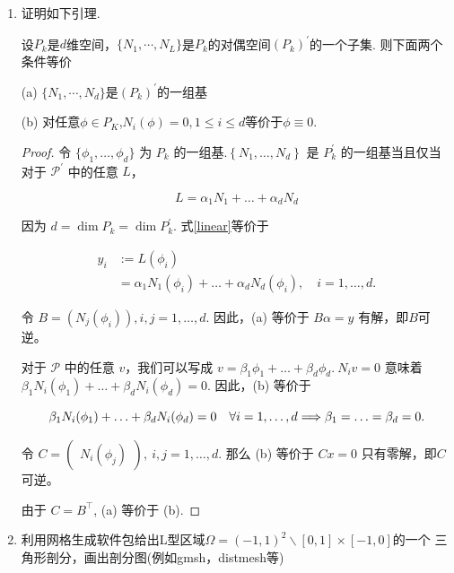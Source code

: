 \documentclass[12pt,a4paper]{article}
\begin{document}
	\begin{enumerate}
		\item 证明如下引理.
		
		设$P_k$是$d$维空间，$\{N_1,\cdots,N_L\}$是$P_k$的对偶空间$(P_k)^{\prime}$的一个子集. 则下面两个条件等价
		
		(a) $\{N_1,\cdots,N_d\}$是$(P_k)^{\prime}$的一组基
		
		(b) 对任意$\phi\in P_K$,$N_i(\phi)=0,1\leq i\leq d$等价于$\phi\equiv0.$
		
		\begin{proof}
			令 $\{\phi_1, \ldots , \phi_d\} $ 为 $P_k$ 的一组基.$\left\{N_1,\ldots,N_d\right\}$ 是 $P_k^{\prime}$ 的一组基当且仅当对于 $\mathcal{P} ^{\prime}$ 中的任意 $L$，
			
			\begin{equation}
				L=\alpha_1N_1+\ldots+\alpha_dN_d  \label{linear}
			\end{equation}
			
			因为 $d= \dim P_k = \dim P_k ^{\prime}$. 式\eqref{linear}等价于
			
			\begin{equation}
				\begin{aligned}
					y_i &:= L(\phi_i) \\
					&= \alpha_1N_1(\phi_i)+\ldots+\alpha_dN_d(\phi_i),\quad i=1,\ldots,d.
				\end{aligned}
			\end{equation}
			
			
			令 $B=\left(N_j(\phi_i)\right),i,j=1,\ldots,d.$ 因此，(a) 等价于 $B\alpha=y$ 有解，即$B$可逆。
			
			对于 $\mathcal{P}$ 中的任意 $v$，我们可以写成 $v=\beta_1\phi_1+\ldots+\beta_d\phi_d.~N_iv=0$ 意味着 $\beta_1N_i(\phi_1)+\ldots+\beta_dN_i(\phi_d)=0.$ 因此，(b) 等价于
			
			\begin{equation}
				\beta_{1}N_{i}(\phi_{1})+\ldots+\beta_{d}N_{i}(\phi_{d})=0\quad\forall i=1,\ldots,d\\\Longrightarrow\beta_{1}=\ldots=\beta_{d}=0.
			\end{equation}
			
			令 $C=\begin{pmatrix}N_i(\phi_j)\end{pmatrix},\:i,j=1,\ldots,d.$ 那么 (b) 等价于 $Cx=0$ 只有零解，即$C$可逆。
			
			由于 $C=B^\top$, (a) 等价于 (b).
			
		\end{proof}
		\item 利用网格生成软件包给出L型区域$\Omega=(-1,1)^2\backslash[0,1]\times[-1,0]$的一个
		三角形剖分，画出剖分图(例如gmsh，distmesh等)
		

\end{enumerate}
\end{document}
